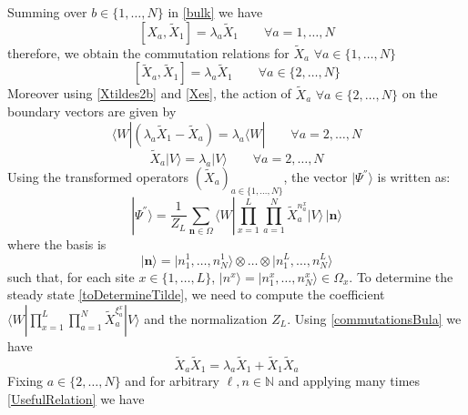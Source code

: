 \documentclass[11pt]{article}
\numberwithin{equation}{section}
\numberwithin{equation}{subsection}
\newcommand{\Xt}{\tilde{X}}
\begin{document}
Summing over $b\in \{1,\ldots,N\}$ in \eqref{bulk} we have
\begin{equation} 
	\left[X_{a},\Xt_{1}\right]=\lambda_{a}\Xt_{1}\qquad\forall a=1,\ldots,N
\end{equation}
therefore, we obtain the commutation relations for $\Xt_{a}$ $\forall a\in \{1,\ldots,N\}$
\begin{equation}\label{commutationsBula}
	\left[\Xt_{a},\Xt_{1}\right]=\lambda_{a}\Xt_{1}\qquad \forall a\in \{2,\ldots,N\}
\end{equation}
Moreover using \eqref{Xtildes2b} and \eqref{Xes}, the action of $\Xt_{a}$ $\forall a\in \{2,\ldots,N\}$ on the boundary vectors are given by 
\begin{equation}\label{commLEFT}
	\langle W|\left(\lambda_{a}\Xt_{1}-\Xt_{a}\right)=\lambda_{a}\langle W|\qquad\forall a=2,\ldots,N
\end{equation}
\begin{equation}\label{commRIGHT}
	\Xt_{a} |V\rangle= \lambda_{a}|V\rangle\qquad\forall a=2,\ldots,N
\end{equation} 
Using the transformed operators $(\widetilde{X}_{a})_{a\in\{1,\ldots,N\}}$, the vector $|\Psi^{''}\rangle$ is written as:
\begin{equation}\label{toDetermineTilde}
	|\Psi^{''}\rangle = \frac{1}{Z_{L}}\sum_{\bm{n}\in \Omega}\langle W|\prod_{x=1}^{L}\prod_{a=1}^{N}\widetilde{X}_{a}^{n_{a}^{x}}
	|V \rangle \,|\bm{n}\rangle
\end{equation}
where the basis is 
$$
|\bm{n}\rangle =|n_{1}^{1},\ldots,n_{N}^{1}\rangle \otimes \ldots\otimes |n_{1}^{L},\ldots,n_{N}^{L}\rangle
$$
such that, for each site $x\in \{1,\ldots,L\}$, $|n^{x}\rangle=|n_{1}^{x},\ldots,n_{N}^{x}\rangle\in \Omega_{x}$. 
To determine the steady state \eqref{toDetermineTilde}, we need to compute the coefficient $\langle W|\prod_{x=1}^{L}\prod_{a=1}^{N}\widetilde{X}_{a}^{\xi_{a}^{x}}
|V \rangle$ and the normalization $Z_{L}$. Using \eqref{commutationsBula} we have
\begin{equation}\label{UsefulRelation}
	\widetilde{X}_{a}\widetilde{X}_{1}=\lambda_{a}\widetilde{X}_{1}+\widetilde{X}_{1}\widetilde{X}_{a}
\end{equation}
Fixing $ a\in \{2,\ldots,N\}$ and for arbitrary $ \ell,n\in \mathbb{N}$ and applying many times \eqref{UsefulRelation} we have
\end{document}
